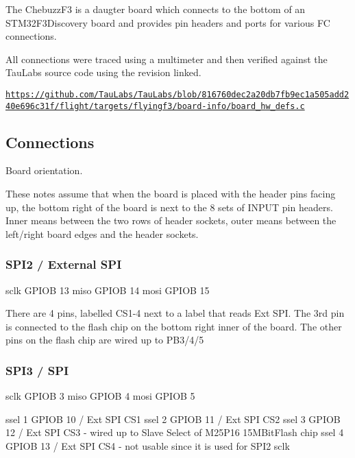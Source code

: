 The Chebuzz\+F3 is a daugter board which connects to the bottom of an S\+T\+M32\+F3\+Discovery board and provides pin headers and ports for various F\+C connections.

All connections were traced using a multimeter and then verified against the Tau\+Labs source code using the revision linked.

\href{https://github.com/TauLabs/TauLabs/blob/816760dec2a20db7fb9ec1a505add240e696c31f/flight/targets/flyingf3/board-info/board_hw_defs.c}{\tt https\+://github.\+com/\+Tau\+Labs/\+Tau\+Labs/blob/816760dec2a20db7fb9ec1a505add240e696c31f/flight/targets/flyingf3/board-\/info/board\+\_\+hw\+\_\+defs.\+c}

\subsection*{Connections}

Board orientation.

These notes assume that when the board is placed with the header pins facing up, the bottom right of the board is next to the 8 sets of I\+N\+P\+U\+T pin headers. Inner means between the two rows of header sockets, outer means between the left/right board edges and the header sockets.

\subsubsection*{S\+P\+I2 / External S\+P\+I}

sclk G\+P\+I\+O\+B 13 miso G\+P\+I\+O\+B 14 mosi G\+P\+I\+O\+B 15

There are 4 pins, labelled C\+S1-\/4 next to a label that reads Ext S\+P\+I. The 3rd pin is connected to the flash chip on the bottom right inner of the board. The other pins on the flash chip are wired up to P\+B3/4/5

\subsubsection*{S\+P\+I3 / S\+P\+I}

sclk G\+P\+I\+O\+B 3 miso G\+P\+I\+O\+B 4 mosi G\+P\+I\+O\+B 5

ssel 1 G\+P\+I\+O\+B 10 / Ext S\+P\+I C\+S1 ssel 2 G\+P\+I\+O\+B 11 / Ext S\+P\+I C\+S2 ssel 3 G\+P\+I\+O\+B 12 / Ext S\+P\+I C\+S3 -\/ wired up to Slave Select of M25\+P16 15\+M\+Bit\+Flash chip ssel 4 G\+P\+I\+O\+B 13 / Ext S\+P\+I C\+S4 -\/ not usable since it is used for S\+P\+I2 sclk

